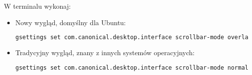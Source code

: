 W terminalu wykonaj:
\begin{itemize}
\item Nowy wygląd, domyślny dla Ubuntu:

\begin{lstlisting}[language=bash]
gsettings set com.canonical.desktop.interface scrollbar-mode overlay-auto
\end{lstlisting}

\item Tradycyjny wygląd, znany z innych systemów operacyjnych:

\begin{lstlisting}[language=bash]
gsettings set com.canonical.desktop.interface scrollbar-mode normal
\end{lstlisting}

\end{itemize}
